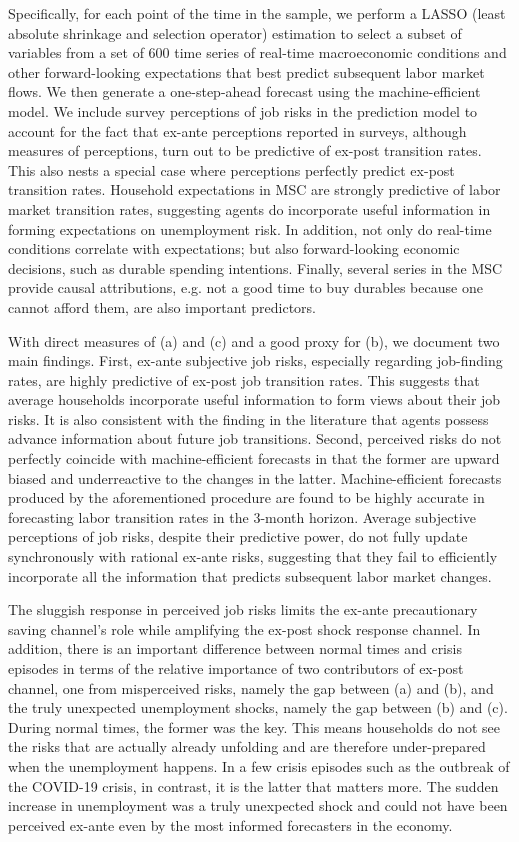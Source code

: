          
Specifically, for each point of the time in the sample, we perform a LASSO (least absolute shrinkage and selection operator) estimation to select a subset of variables from a set of 600 time series of real-time macroeconomic conditions and other forward-looking expectations that best predict subsequent labor market flows. We then generate a one-step-ahead forecast using the machine-efficient model. We include survey perceptions of job risks in the prediction model to account for the fact that ex-ante perceptions reported in surveys, although measures of perceptions, turn out to be predictive of ex-post transition rates. This also nests a special case where perceptions perfectly predict ex-post transition rates. Household expectations in MSC are strongly predictive of labor market transition rates, suggesting agents do incorporate useful information in forming expectations on unemployment risk. In addition, not only do real-time conditions correlate with expectations; but also forward-looking economic decisions, such as durable spending intentions. Finally, several series in the MSC provide causal attributions, e.g. not a good time to buy durables because one cannot afford them, are also important predictors. 


With direct measures of (a) and (c) and a good proxy for (b), we document two main findings. First, ex-ante subjective job risks, especially regarding job-finding rates, are highly predictive of ex-post job transition rates. This suggests that average households incorporate useful information to form views about their job risks. It is also consistent with the finding in the literature that agents possess advance information about future job transitions. Second, perceived risks do not perfectly coincide with machine-efficient forecasts in that the former are upward biased and underreactive to the changes in the latter. Machine-efficient forecasts produced by the aforementioned procedure are found to be highly accurate in forecasting labor transition rates in the 3-month horizon. Average subjective perceptions of job risks, despite their predictive power, do not fully update synchronously with rational ex-ante risks, suggesting that they fail to efficiently incorporate all the information that predicts subsequent labor market changes. 

The sluggish response in perceived job risks limits the ex-ante precautionary saving channel's role while amplifying the ex-post shock response channel. In addition, there is an important difference between normal times and crisis episodes in terms of the relative importance of two contributors of ex-post channel, one from misperceived risks, namely the gap between (a) and (b), and the truly unexpected unemployment shocks, namely the gap between (b) and (c). During normal times, the former was the key. This means households do not see the risks that are actually already unfolding and are therefore under-prepared when the unemployment happens. In a few crisis episodes such as the outbreak of the COVID-19 crisis, in contrast, it is the latter that matters more. The sudden increase in unemployment was a truly unexpected shock and could not have been perceived ex-ante even by the most informed forecasters in the economy.      

